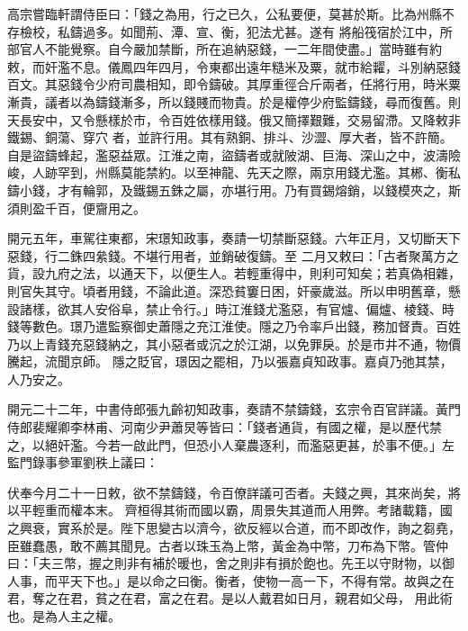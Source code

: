 \begin{pinyinscope}
 高宗嘗臨軒謂侍臣曰：「錢之為用，行之已久，公私要便，莫甚於斯。比為州縣不存檢校，私鑄過多。如聞荊、潭、宣、衡，犯法尤甚。遂有
 將船筏宿於江中，所部官人不能覺察。自今嚴加禁斷，所在追納惡錢，一二年間使盡。」當時雖有約敕，而奸濫不息。儀鳳四年四月，令東都出遠年糙米及粟，就市給糶，斗別納惡錢百文。其惡錢令少府司農相知，即令鑄破。其厚重徑合斤兩者，任將行用，時米粟漸貴，議者以為鑄錢漸多，所以錢賤而物貴。於是權停少府監鑄錢，尋而復舊。則天長安中，又令懸樣於市，令百姓依樣用錢。俄又簡擇艱難，交易留滯。又降敕非鐵錫、銅蕩、穿穴
 者，並許行用。其有熟銅、排斗、沙澀、厚大者，皆不許簡。自是盜鑄蜂起，濫惡益眾。江淮之南，盜鑄者或就陂湖、巨海、深山之中，波濤險峻，人跡罕到，州縣莫能禁約。以至神龍、先天之際，兩京用錢尤濫。其郴、衡私鑄小錢，才有輪郭，及鐵錫五銖之屬，亦堪行用。乃有買錫熔銷，以錢模夾之，斯須則盈千百，便齎用之。



 開元五年，車駕往東都，宋璟知政事，奏請一切禁斷惡錢。六年正月，又切斷天下惡錢，行二銖四絫錢。不堪行用者，並銷破復鑄。至
 二月又敕曰：「古者聚萬方之貨，設九府之法，以通天下，以便生人。若輕重得中，則利可知矣；若真偽相雜，則官失其守。頃者用錢，不論此道。深恐貧窶日困，奸豪歲滋。所以申明舊章，懸設諸樣，欲其人安俗阜，禁止令行。」時江淮錢尤濫惡，有官爐、偏爐、棱錢、時錢等數色。璟乃遣監察御史蕭隱之充江淮使。隱之乃令率戶出錢，務加督責。百姓乃以上青錢充惡錢納之，其小惡者或沉之於江湖，以免罪戾。於是市井不通，物價騰起，流聞京師。
 隱之貶官，璟因之罷相，乃以張嘉貞知政事。嘉貞乃弛其禁，人乃安之。



 開元二十二年，中書侍郎張九齡初知政事，奏請不禁鑄錢，玄宗令百官詳議。黃門侍郎裴耀卿李林甫、河南少尹蕭炅等皆曰：「錢者通貨，有國之權，是以歷代禁之，以絕奸濫。今若一啟此門，但恐小人棄農逐利，而濫惡更甚，於事不便。」左監門錄事參軍劉秩上議曰：



 伏奉今月二十一日敕，欲不禁鑄錢，令百僚詳議可否者。夫錢之興，其來尚矣，將以平輕重而權本末。
 齊桓得其術而國以霸，周景失其道而人用弊。考諸載籍，國之興衰，實系於是。陛下思變古以濟今，欲反經以合道，而不即改作，詢之芻堯，臣雖蠢愚，敢不薦其聞見。古者以珠玉為上幣，黃金為中幣，刀布為下幣。管仲曰：「夫三幣，握之則非有補於暖也，舍之則非有損於飽也。先王以守財物，以御人事，而平天下也。」是以命之曰衡。衡者，使物一高一下，不得有常。故與之在君，奪之在君，貧之在君，富之在君。是以人戴君如日月，親君如父母，
 用此術也。是為人主之權。




\end{pinyinscope}
